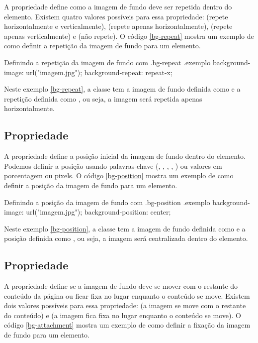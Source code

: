 A propriedade  define como a imagem de fundo deve ser repetida dentro do elemento. Existem quatro valores possíveis para essa propriedade:  (repete horizontalmente e verticalmente),  (repete apenas horizontalmente),  (repete apenas verticalmente) e  (não repete). O código \ref{bg-repeat} mostra um exemplo de como definir a repetição da imagem de fundo para um elemento.

\begin{csscode}{Definindo a repetição da imagem de fundo com .}{bg-repeat}
.exemplo {
    background-image: url("imagem.jpg");
    background-repeat: repeat-x;
}
\end{csscode}

Neste exemplo \ref{bg-repeat}, a classe  tem a imagem de fundo definida como  e a repetição definida como , ou seja, a imagem será repetida apenas horizontalmente.

\subsection{Propriedade }

A propriedade  define a posição inicial da imagem de fundo dentro do elemento. Podemos definir a posição usando palavras-chave (, , , , ) ou valores em porcentagem ou pixels. O código \ref{bg-position} mostra um exemplo de como definir a posição da imagem de fundo para um elemento.

\begin{csscode}{Definindo a posição da imagem de fundo com .}{bg-position}
.exemplo {
    background-image: url("imagem.jpg");
    background-position: center;
}
\end{csscode}

Neste exemplo \ref{bg-position}, a classe  tem a imagem de fundo definida como  e a posição definida como , ou seja, a imagem será centralizada dentro do elemento.

\subsection{Propriedade }

A propriedade  define se a imagem de fundo deve se mover com o restante do conteúdo da página ou ficar fixa no lugar enquanto o conteúdo se move. Existem dois valores possíveis para essa propriedade:  (a imagem se move com o restante do conteúdo) e  (a imagem fica fixa no lugar enquanto o conteúdo se move). O código \ref{bg-attachment} mostra um exemplo de como definir a fixação da imagem de fundo para um elemento.

